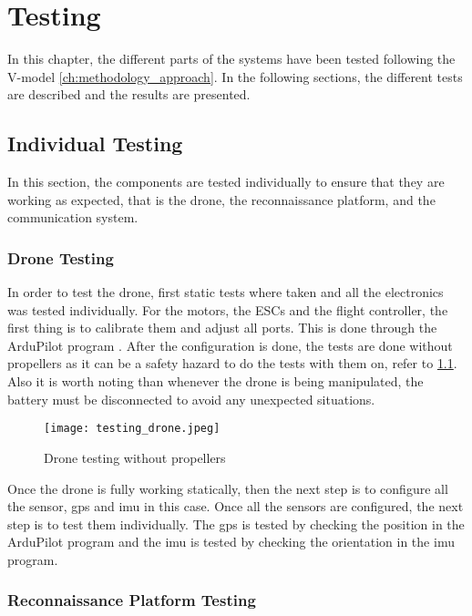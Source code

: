 \chapter{Testing}\label{ch:testing}

In this chapter, the different parts of the systems have been tested following the V-model \cref{ch:methodology_approach}. In the following sections, the different tests are described and the results are presented.

\section{Individual Testing}\label{sec:individual_testing}

In this section, the components are tested individually to ensure that they are working as expected, that is the drone, the reconnaissance platform, and the communication system.

\subsection{Drone Testing}\label{subsec:drone_testing}

In order to test the drone, first static tests where taken and all the electronics was tested individually. For the motors, the ESCs and the flight controller, the first thing is to calibrate them and adjust all ports. This is done through the ArduPilot program \autocite{ardupilotMissionPlanner}. After the configuration is done, the tests are done without propellers as it can be a safety hazard to do the tests with them on, refer to \cref{fig:drone_testing}. Also it is worth noting than whenever the drone is being manipulated, the battery must be disconnected to avoid any unexpected situations.

\begin{figure}
	\texttt{[image: testing\_drone.jpeg]}
	\caption{Drone testing without propellers}\label{fig:drone_testing}
\end{figure}

Once the drone is fully working statically, then the next step is to configure all the sensor, \gls{gps} and \gls{imu} in this case. Once all the sensors are configured, the next step is to test them individually. The \gls{gps} is tested by checking the position in the ArduPilot program and the \gls{imu} is tested by checking the orientation in the \gls{imu} program.

\subsection{Reconnaissance Platform Testing}\label{subsec:reconnaissance_platform_testing}

